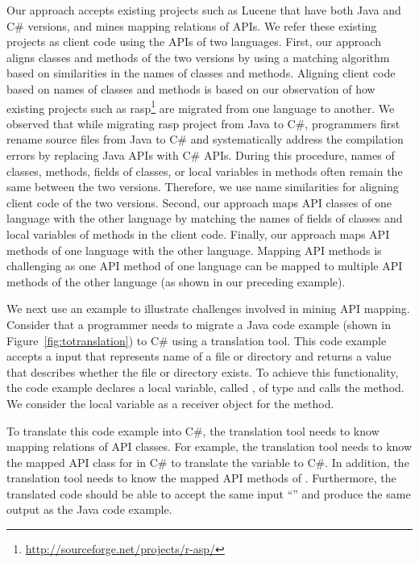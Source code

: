Our approach accepts existing projects such as Lucene that have both
Java and C\# versions, and mines mapping relations of APIs. We refer
these existing projects as client code using the APIs of two
languages. First, our approach aligns classes and methods of the two
versions by using a matching algorithm based on similarities in the
names of classes and methods. Aligning client code based on names of
classes and methods is based on our observation of how existing
projects such as
rasp\footnote{\url{http://sourceforge.net/projects/r-asp/}} are
migrated from one language to another. We observed that while
migrating rasp project from Java to C\#, programmers first rename
source files from Java to C\# and systematically address the
compilation errors by replacing Java APIs with C\# APIs. During this
procedure, names of classes, methods, fields of classes, or local
variables in methods often remain the same between the two versions.
Therefore, we use name similarities for aligning client code of the
two versions. Second, our approach maps API classes of one language
with the other language by matching the names of fields of classes
and local variables of methods in the client code. Finally, our
approach maps API methods of one language with the other language.
Mapping API methods is challenging as one API method of one language
can be mapped to multiple API methods of the other language (as
shown in our preceding example).


We next use an example to illustrate challenges involved in
mining API mapping. Consider that a programmer needs to migrate
a Java code example (shown in Figure~\ref{fig:totranslation}) to C\# using a translation tool.
This code example accepts a  input that represents
name of a file or directory and returns a  value that
describes whether the file or directory exists. To achieve this functionality,
the code example declares a local variable, called ,
of type  and calls the  method.
We consider the local variable  as a receiver object for
the  method.

To translate this code example into C\#, the translation
tool needs to know mapping relations of API classes. For example,
the translation tool needs to know the mapped API class for 
in C\# to translate the variable  to C\#. In addition, the translation tool needs
to know the mapped API methods of . Furthermore,
the translated code should be able to accept the same input
``'' and produce the same output as the Java code example.

